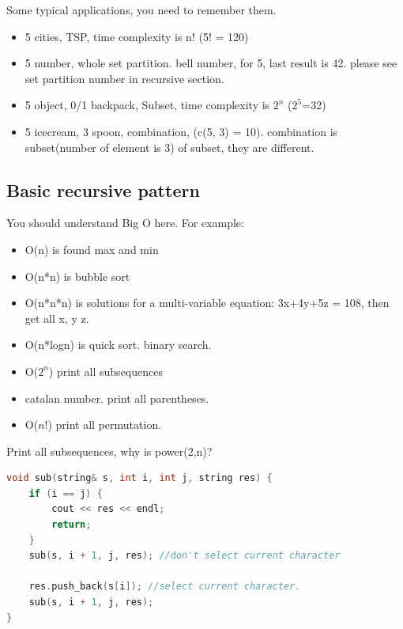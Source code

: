 \documentclass[a4paper,11pt,twoside]{book}
\begin{document}
\par Some typical applications, you need to remember them.
\begin{itemize}
	\item 5 cities, TSP, time complexity is n! (5! = 120)
	
	\item 5 number, whole set partition.  bell number, for 5, last result is 42. please see set partition number in recursive section.
	
	\item 5 object, 0/1 backpack,  Subset, time complexity is $2^n$ ($2^5$=32)
	
	\item 5 icecream, 3 spoon,  combination, (c(5, 3) = 10). combination is subset(number of element is 3) of subset, they are different. 
	
\end{itemize}
	
	
\subsection{Basic recursive pattern}

	\par You should understand Big O here. For example:
	\begin{itemize}
		\item O(n) is found max and min
		
		\item O(n*n) is bubble sort
		
		\item O(n*n*n) is solutions for a multi-variable equation: 3x+4y+5z = 108, then get all x, y z.
		
		\item O(n*logn) is quick sort. binary search. 
		
		\item O($2^{n}$) print all subsequences
		
		\item catalan number. print all parentheses.
		
		\item O($n!$) print all permutation.
	\end{itemize}
		
	\par Print all subsequences, why is power(2,n)?

\begin{lstlisting}[frame=single, language=c++]
void sub(string& s, int i, int j, string res) {
	if (i == j) {
		cout << res << endl;
		return;
	}
	sub(s, i + 1, j, res); //don't select current character
	
	res.push_back(s[i]); //select current character.
	sub(s, i + 1, j, res);
}	
\end{lstlisting}	
	
\end{document}
